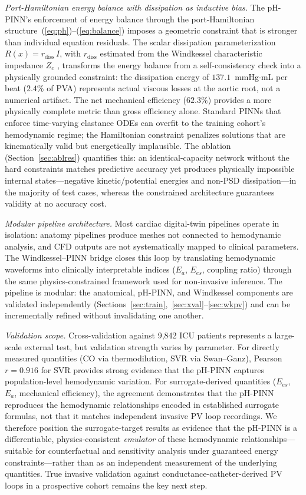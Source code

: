 \documentclass[journal]{IEEEtran}
\begin{document}
\emph{Port-Hamiltonian energy balance with dissipation as inductive bias.} The pH-PINN's enforcement of energy balance through the port-Hamiltonian structure~(\ref{eq:ph})--(\ref{eq:balance}) imposes a geometric constraint that is stronger than individual equation residuals. The scalar dissipation parameterization $R(x)=r_{\text{diss}}\,I$, with $r_{\text{diss}}$ estimated from the Windkessel characteristic impedance $Z_c$ \cite{westerhof2009}, transforms the energy balance from a self-consistency check into a physically grounded constraint: the dissipation energy of $137.1$~mmHg$\cdot$mL per beat ($2.4\%$ of PVA) represents actual viscous losses at the aortic root, not a numerical artifact. The net mechanical efficiency ($62.3\%$) provides a more physically complete metric than gross efficiency alone. Standard PINNs that enforce time-varying elastance ODEs can overfit to the training cohort's hemodynamic regime; the Hamiltonian constraint penalizes solutions that are kinematically valid but energetically implausible. The ablation (Section~\ref{sec:ablres}) quantifies this: an identical-capacity network without the hard constraints matches predictive accuracy yet produces physically impossible internal states---negative kinetic/potential energies and non-PSD dissipation---in the majority of test cases, whereas the constrained architecture guarantees validity at no accuracy cost.

\emph{Modular pipeline architecture.} Most cardiac digital-twin pipelines operate in isolation: anatomy pipelines produce meshes not connected to hemodynamic analysis, and CFD outputs are not systematically mapped to clinical parameters. The Windkessel--PINN bridge closes this loop by translating hemodynamic waveforms into clinically interpretable indices ($E_a$, $E_{es}$, coupling ratio) through the same physics-constrained framework used for non-invasive inference. The pipeline is modular: the anatomical, pH-PINN, and Windkessel components are validated independently (Sections~\ref{sec:train},~\ref{sec:xval}--\ref{sec:wkpv}) and can be incrementally refined without invalidating one another.

\emph{Validation scope.} Cross-validation against 9{,}842 ICU patients represents a large-scale external test, but validation strength varies by parameter. For directly measured quantities (CO via thermodilution, SVR via Swan--Ganz), Pearson $r=0.916$ for SVR provides strong evidence that the pH-PINN captures population-level hemodynamic variation. For surrogate-derived quantities ($E_{es}$, $E_a$, mechanical efficiency), the agreement demonstrates that the pH-PINN reproduces the hemodynamic relationships encoded in established surrogate formulas, not that it matches independent invasive PV loop recordings. We therefore position the surrogate-target results as evidence that the pH-PINN is a differentiable, physics-consistent \emph{emulator} of these hemodynamic relationships---suitable for counterfactual and sensitivity analysis under guaranteed energy constraints---rather than as an independent measurement of the underlying quantities. True invasive validation against conductance-catheter-derived PV loops in a prospective cohort remains the key next step.
\end{document}
